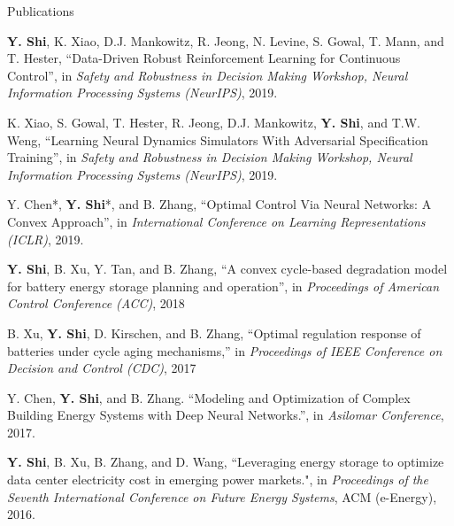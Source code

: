 \documentclass{resume} %
\begin{document}
\begin{rSection}{Publications}
\begin{enumerate}[wide, label={[\arabic*]. }, labelindent=0pt]
	\item \textbf{Y. Shi}, K. Xiao, D.J. Mankowitz, R. Jeong, N. Levine, S. Gowal, T. Mann, and T. Hester, ``Data-Driven Robust Reinforcement Learning for Continuous Control'', in \emph{Safety and Robustness in Decision Making Workshop, Neural Information Processing Systems (NeurIPS)}, 2019.
	
	\item K. Xiao, S. Gowal, T. Hester, R. Jeong, D.J. Mankowitz, \textbf{Y. Shi}, and T.W. Weng, ``Learning Neural Dynamics Simulators With Adversarial Specification Training'', in \emph{Safety and Robustness in Decision Making Workshop, Neural Information Processing Systems (NeurIPS)}, 2019.
	
	\item Y. Chen*, \textbf{Y. Shi}*, and B. Zhang, ``Optimal Control Via Neural Networks: A Convex Approach'', in \emph{International Conference on Learning Representations (ICLR)}, 2019.  
		
	\item \textbf{Y. Shi}, B. Xu, Y. Tan, and B. Zhang, ``A convex cycle-based degradation model for battery energy storage planning and operation'', in \emph{Proceedings of American Control Conference (ACC)}, 2018 
		
	\item B. Xu, \textbf{Y. Shi}, D. Kirschen, and B. Zhang, “Optimal regulation response of batteries under cycle aging mechanisms,” in \emph{Proceedings of IEEE Conference on Decision and Control (CDC)}, 2017
		
	\item Y. Chen, \textbf{Y. Shi}, and B. Zhang. ``Modeling and Optimization of Complex Building Energy Systems with Deep Neural Networks.'', in \emph{Asilomar Conference}, 2017.
		
	\item \textbf{Y. Shi}, B. Xu, B. Zhang, and D. Wang, {``Leveraging energy storage to optimize data center electricity cost in emerging power markets."}, in \emph{Proceedings of the Seventh International Conference on Future Energy Systems}, ACM (e-Energy), 2016. 
	\end{enumerate}
\end{rSection}
\end{document}
